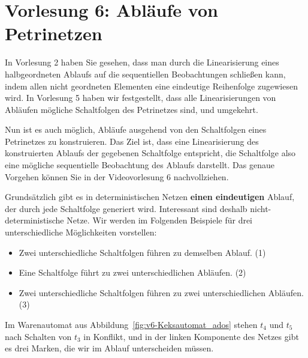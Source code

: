 \section{Vorlesung 6: Abläufe von Petrinetzen}

In Vorlesung 2 haben Sie gesehen, 
dass man durch die Linearisierung eines halbgeordneten Ablaufs auf die sequentiellen Beobachtungen schließen kann, indem allen nicht geordneten Elementen eine eindeutige Reihenfolge zugewiesen wird. In Vorlesung 5 haben wir festgestellt, dass alle Linearisierungen von Abläufen mögliche Schaltfolgen des Petrinetzes sind, und umgekehrt.

Nun ist es auch möglich, Abläufe ausgehend von den Schaltfolgen eines Petri\-netzes zu konstruieren. Das Ziel ist, dass eine Linearisierung des konstruierten Ablaufs der gegebenen Schaltfolge entspricht, die Schaltfolge also eine mögliche sequentielle Beobachtung des Ablaufs darstellt. Das genaue Vorgehen können Sie in der Videovorlesung 6 nachvollziehen.

Grundsätzlich gibt es in deterministischen Netzen \textbf{einen eindeutigen} Ablauf, der durch jede Schaltfolge generiert wird. Interessant sind deshalb nicht-deterministische Netze. Wir werden im Folgenden Beispiele für drei unterschiedliche Möglichkeiten vorstellen:

\begin{itemize}
	\item Zwei unterschiedliche Schaltfolgen führen zu demselben Ablauf. (1)
	\item Eine Schaltfolge führt zu zwei unterschiedlichen Abläufen. (2)
	\item Zwei unterschiedliche Schaltfolgen führen zu zwei unterschiedlichen Abläufen. (3)
\end{itemize}

Im Warenautomat aus Abbildung~\ref{fig:v6-Keksautomat_ados} stehen  $t_4$ und $t_5$ nach Schalten von $t_3$ in Konflikt, und in der linken Komponente des Netzes gibt es drei Marken, die wir im Ablauf unterscheiden müssen.

